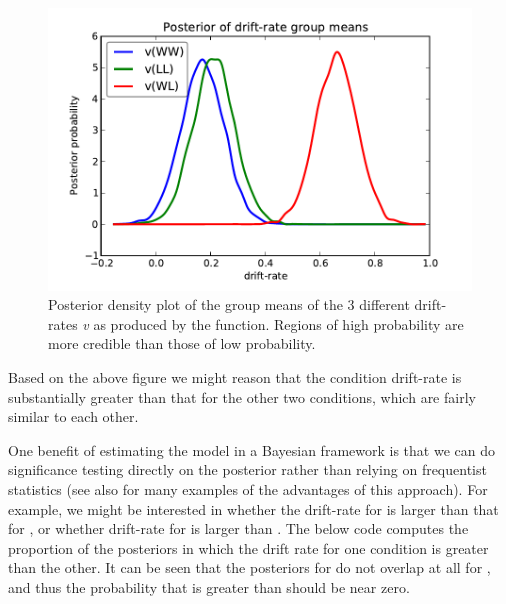 \documentclass[letterpaper,10pt,english]{article}
\begin{document}
\begin{figure}[H]
\includegraphics[scale=.7]{hddm_demo_fig_06.pdf}
\caption{Posterior density plot of the group means of the 3 different drift-rates \emph{v} as produced by the  function. Regions of high probability are more credible than those of low probability.}
\label{fig.post_drift}
\end{figure}
Based on the above figure we might reason that the  condition drift-rate is substantially greater than that for the other two conditions, which are fairly similar to each other.

One benefit of estimating the model in a Bayesian framework is that we can do significance testing directly on the posterior rather than relying on frequentist statistics \citep{Lindley65} (see also \citet{Kruschke10} for many examples of the advantages of this approach). For example, we might be interested in whether the drift-rate for  is larger than that for , or whether drift-rate for  is larger than . The below code computes the proportion of the posteriors in which the drift rate for one condition is greater than the other. It can be seen that the posteriors for  do not overlap at all for , and thus the probability that  is greater than  should be near zero. 
\end{document}
